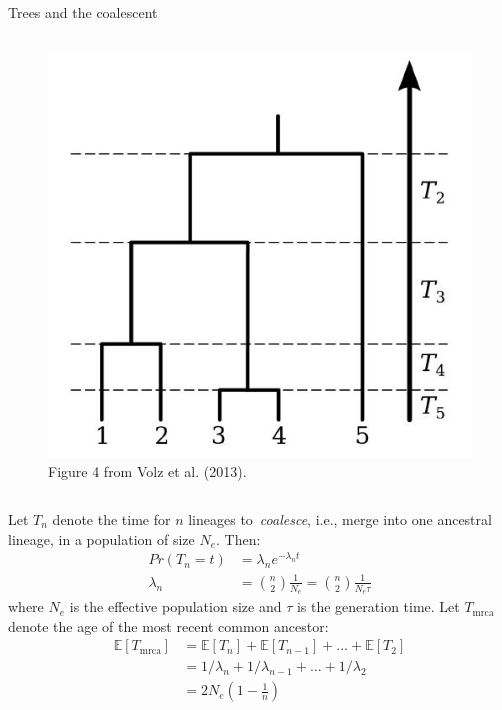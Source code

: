 \documentclass[newPxFont,numfooter,sectionpages]{beamer}
\begin{document}
\begin{frame}{Trees and the coalescent}

\begin{column}{0.5\textwidth}
 \begin{figure}[!h]
\begin{center}
\includegraphics[scale=.45]{figures/coaltimes.jpg}
\caption{Figure 4 from Volz et al. (2013).}
\end{center}
\end{figure}
\end{column}
\begin{column}{0.45\textwidth}
{\tiny
 Let $T_n$ denote the time for $n$ lineages to~\textit{coalesce}, i.e., merge into one ancestral lineage, in a population of size $N_e$.
 Then:
\begin{align*}
Pr(T_n = t) &= \lambda_n e^{-\lambda_nt}\\
\lambda_n &= \binom{n}{2}\frac{1}{N_e} = \binom{n}{2}\frac{1}{N_e\tau}
\end{align*}
where $N_e$ is the effective population size and $\tau$ is the generation time.
Let $T_{\text{mrca}}$ denote the age of the most recent common ancestor:
\begin{align*}
 \mathbb{E}[T_{\text{mrca}}] &= \mathbb{E}[T_n] + \mathbb{E}[T_{n-1}] + \ldots + \mathbb{E}[T_2]\\
 &= 1/\lambda_n + 1/\lambda_{n-1} + \ldots + 1/\lambda_2\\
 &= 2N_e(1-\frac{1}{n})
\end{align*}
}
\end{column}
\end{frame}
\end{document}
